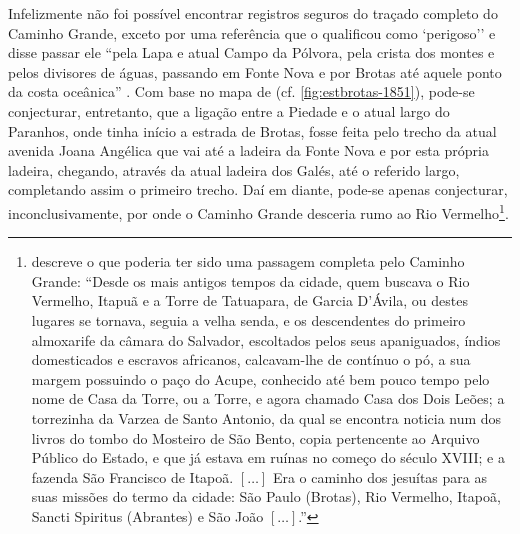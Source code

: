 Infelizmente não foi possível encontrar registros seguros do traçado completo do Caminho Grande, exceto por uma referência que o qualificou como `perigoso'' e disse passar ele ``pela Lapa e atual Campo da Pólvora, pela crista dos montes e pelos divisores de águas, passando em Fonte Nova e por Brotas até aquele ponto da costa oceânica'' \cite[p.~488]{sampaio_salvador_2016}. Com base no mapa de  (cf. \autoref{fig:estbrotas-1851}), pode-se conjecturar, entretanto, que a ligação entre a Piedade e o atual largo do Paranhos, onde tinha início a estrada de Brotas, fosse feita pelo trecho da atual avenida Joana Angélica que vai até a ladeira da Fonte Nova e por esta própria ladeira, chegando, através da atual ladeira dos Galés, até o referido largo, completando assim o primeiro trecho. Daí em diante, pode-se apenas conjecturar, inconclusivamente, por onde o Caminho Grande desceria rumo ao Rio Vermelho\footnote{ descreve o que poderia ter sido uma passagem completa pelo Caminho Grande: ``Desde os mais antigos tempos da cidade, quem buscava o Rio Vermelho, Itapuã e a Torre de Tatuapara, de Garcia D'Ávila, ou destes lugares se tornava, seguia a velha senda, e os descendentes do primeiro almoxarife da câmara do Salvador, escoltados pelos seus apaniguados, índios domesticados e escravos africanos, calcavam-lhe de contínuo o pó, a sua margem possuindo o paço do Acupe, conhecido até bem pouco tempo pelo nome de Casa da Torre, ou a Torre, e agora chamado Casa dos Dois Leões; a torrezinha da Varzea de Santo Antonio, da qual se encontra noticia num dos livros do tombo do Mosteiro de São Bento, copia pertencente ao Arquivo Público do Estado, e que já estava em ruínas no começo do século XVIII; e a fazenda São Francisco de Itapoã. \([\dots]\) Era o caminho dos jesuítas para as suas missões do termo da cidade: São Paulo (Brotas), Rio Vermelho, Itapoã, Sancti Spiritus (Abrantes) e São João \([\dots]\).''}.

